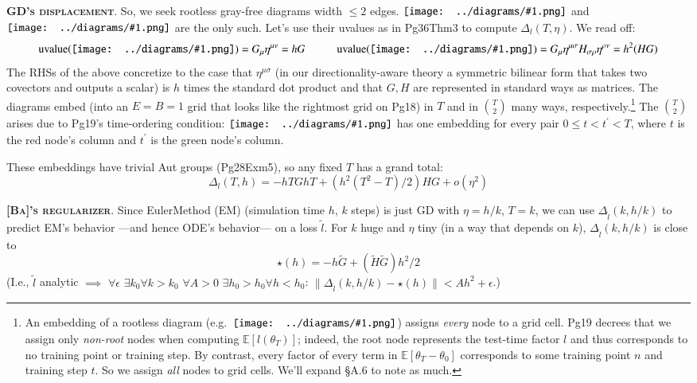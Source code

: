 \documentclass[12pt]{article}
\newcommand{\EE}{\mathbb{E}}
\newcommand{\pag}[1]{\textmd{{\color{gray}Pg}{#1}}}
\newcommand{\thm}[1]{\textmd{{\color{gray}Thm}{#1}}}
\newcommand{\exm}[1]{\textmd{{\color{gray}Exm}{#1}}}
\newcommand{\cit}[1]{[\textbf{#1}]}
\newcommand{\moosect}[1]{\par\noindent\hspace{-1cm}\textsc{\textbf{#1}}.}
\newcommand{\sizeddia}[2]{%
    \begin{gathered}%
        \texttt{[image: ../diagrams/\#1.png]}%
    \end{gathered}%
}
\newcommand{\mdia}[1]{\protect \sizeddia{#1}{0.14}}
\begin{document}
\moosect{GD's displacement}
    So, we seek rootless gray-free diagrams width $\leq 2$ edges. 
    $\mdia{MOOc(0)(0)}$ and
    $\mdia{MOOc(0-1)(01-1)}$ are the only such.
    Let's use their uvalues as in \pag{36}\thm{3} to compute $\Delta_l(T,\eta)$.
    We read off:
    $$
    \text{uvalue}(\mdia{MOOc(0)(0)}) = G_\mu \eta^{\mu\nu} = h G 
    \hspace{1cm}
    \text{uvalue}(\mdia{MOOc(0-1)(01-1)}) = G_\mu \eta^{\mu\sigma} H_{\sigma\rho} \eta^{\rho\nu} = h^2 (H G)   
    $$
    The RHSs of the above concretize to the case that $\eta^{\mu\sigma}$ (in our
    directionality-aware theory a symmetric bilinear form that takes two covectors and outputs a
    scalar) is $h$ times the standard dot product and that $G, H$ are represented
    in standard ways as matrices.
    The diagrams embed (into an $E=B=1$ grid that looks
    like the rightmost grid on \pag{18}) in $T$ and in ${T\choose 2}$ many
    ways, respectively.\footnote{%
        An embedding of a rootless diagram (e.g.\ $\mdia{MOOc(0-1)(01-1)}$)
        assigns \emph{every} node to a grid cell.  \pag{19}
        decrees that we assign only \emph{non-root} nodes when computing
        $\EE[l(\theta_T)]$; indeed, the root node
        represents the test-time factor $l$ and thus 
        corresponds to no training point or training step.  By contrast,
        every factor of every term in $\EE[\theta_T-\theta_0]$
        corresponds to some training point $n$ and training step $t$.
        So we assign \emph{all} nodes to grid cells.  We'll expand \S{A.6}
        to note as much.
    }  
    The ${T\choose 2}$ arises due to \pag{19}'s
    time-ordering condition: $\mdia{MOOc(0-1)(01-1)}$ has one embedding for
    every pair $0\leq t<t^\prime<T$, where $t$ is the red node's column
    and $t^\prime$ is the green node's column.

    These embeddings have trivial Aut groups
    (\pag{28}\exm{5}), so any fixed $T$ has a grand total:
    $$
        \Delta_l(T,h)
        =
        -hTG
        hT 
        +
        (h^2(T^2-T)/2)
        HG
        +
        o(\eta^2)
    $$

\moosect{\cit{Ba}'s regularizer}
    Since EulerMethod (EM) (simulation time $h$, $k$ steps) 
    is just GD with $\eta=h/k$, $T=k$, we can use $\Delta_{\tilde l}(k,h/k)$ to predict
    EM's behavior ---and hence ODE's behavior---
    on a loss $\tilde l$.
    For $k$ huge and $\eta$ tiny (in a way that depends on $k$),
    $\Delta_{\tilde l}(k,h/k)$ is close to
    $$
        \star(h) = -h\tilde G
        +
        (\tilde H \tilde G)
        h^2/2
    $$
    (I.e., $\tilde l$ analytic $\implies$
    $\forall\epsilon$ $\exists k_0\forall k>k_0$ $\forall A>0$ $\exists h_0>h_0\forall h<h_0$:
        $\|\Delta_{\tilde l}(k,h/k) - \star(h)\| < A h^2 + \epsilon$.)
\end{document}
